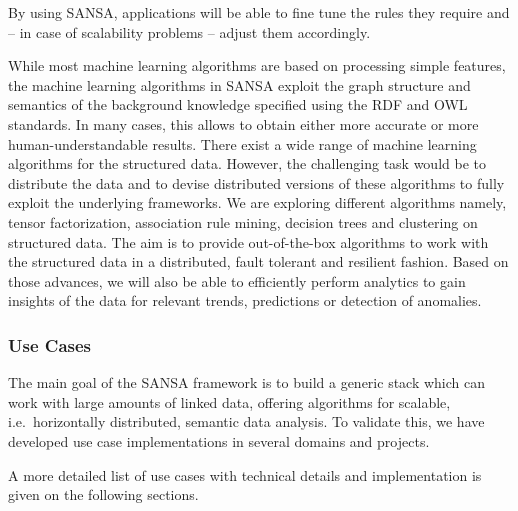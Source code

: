 By using SANSA, applications will be able to fine tune the rules they require and -- in case of scalability problems -- adjust them accordingly.

While most machine learning algorithms are based on processing simple features, the machine learning algorithms in SANSA exploit the graph structure and semantics of the background knowledge specified using the RDF and OWL standards. 
In many cases, this allows to obtain either more accurate or more human-understandable results.
There exist a wide range of machine learning algorithms for the structured data. 
However, the challenging task would be to distribute the data and to devise distributed versions of these algorithms to fully exploit the underlying frameworks. 
We are exploring different algorithms namely, tensor factorization, association rule mining, decision trees and clustering on structured data. 
The aim is to provide out-of-the-box algorithms to work with the structured data in a distributed, fault tolerant and resilient fashion.
Based on those advances, we will also be able to efficiently perform analytics to gain insights of the data for relevant trends, predictions or detection of anomalies.


\subsubsection{Use Cases}
The main goal of the SANSA framework is to build a generic stack which can work with large amounts of linked data, offering algorithms for scalable, i.e.~horizontally distributed, semantic data analysis.
To validate this, we have developed use case implementations in several domains and projects.
   
A more detailed list of use cases with technical details and implementation is given on the following sections.

